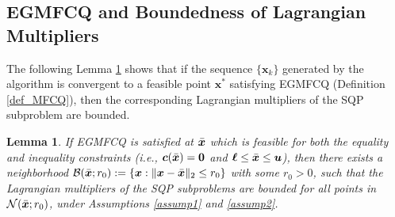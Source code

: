 \documentclass[aos]{imsart}
\numberwithin{equation}{section}
\theoremstyle{plain}
\newtheorem{lemma}{Lemma}
\begin{document}
\begin{appendix}
\subsection{EGMFCQ and Boundedness of Lagrangian Multipliers}
\label{sec:appendix1.2}
 The following Lemma \ref{lemma_mfcq} shows that if the sequence $\{\bm{x}_k\}$ generated by the algorithm is convergent to a feasible point $\bm{x}^{*}$ satisfying EGMFCQ (Definition \ref{def_MFCQ}), then the corresponding Lagrangian multipliers of the SQP subproblem are bounded. 


 \begin{lemma}
\label{lemma_mfcq}
    If EGMFCQ is satisfied at $\Bar{\bm{x}}$ which is feasible for both the equality and inequality constraints (i.e., $\bm{c}(\Bar{\bm{x}}) = \bm{0}$ and $\bm{\ell} \leq \Bar{\bm{x}} \leq \bm{u}$), then there exists a neighborhood $\mathcal{B}(\Bar{\bm{x}}; r_0):= \{\bm{x}: \|\bm{x} - \Bar{\bm{x}}\|_2 \leq r_0\}$ with some  $r_0>0$, such that the Lagrangian multipliers of the SQP subproblems are bounded for all points in $\mathcal{N}(\Bar{\bm{x}}; r_0)$, under Assumptions \ref{assump1} and \ref{assump2}.  
\end{lemma}


\end{appendix}
\end{document}
